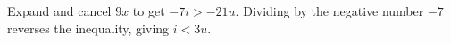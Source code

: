 Expand and cancel $9x$ to get $-7i>-21u$. Dividing by the negative number $-7$ reverses the inequality, giving $\boxed{i<3u}$.

